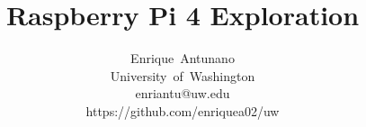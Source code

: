 \documentclass[journal]{IEEEtran}
\begin{document}
    \title{Raspberry Pi 4 Exploration}

    \author{Enrique~Antunano\\University~of~Washington\\enriantu@uw.edu\\https://github.com/enriquea02/uw}


    \maketitle
\end{document}
